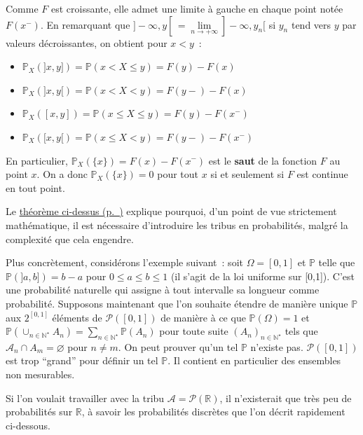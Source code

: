 \begin{remarque}\label{I-quelques-propriuxe9tuxe9s}

Comme \(F\) est croissante, elle admet une limite à gauche en chaque
point notée \(F(x^-)\). En remarquant que
\(]-\infty,y[\, = \lim\limits_{n \to +\infty}]-\infty,y_n[\) si \(y_n\)
tend vers \(y\) par valeurs décroissantes, on obtient pour \(x < y\)~:

\begin{itemize}
\tightlist
\item
  \(\mathbb{P}_X(]x,y]) = \mathbb{P}( x < X \leq y) = F(y) - F(x)\)
\item
  \(\mathbb{P}_X(]x,y[) = \mathbb{P}( x < X < y) = F(y-) - F(x)\)
\item
  \(\mathbb{P}_X([x,y]) = \mathbb{P}( x \leq X \leq y) = F(y) - F(x^-)\)
\item
  \(\mathbb{P}_X([x,y[) = \mathbb{P}( x \leq X < y) = F(y-) - F(x^-)\)
\end{itemize}

En particulier, \(\mathbb{P}_X(\{x\}) = F(x) - F(x^-)\) est le
\textbf{saut} de la fonction \(F\) au point \(x\). On a donc
\(\mathbb{P}_X(\{x\}) = 0\) pour tout \(x\) si et seulement si \(F\) est
continue en tout point.
\end{remarque}

\begin{remarque}\label{I-nuxe9cessituxe9-des-tribus}

Le \protect\hyperref[I-carac]{théorème
ci-dessus (p.~\pageref*{I-carac})} explique pourquoi, d'un point de vue
strictement mathématique, il est nécessaire d'introduire les tribus en
probabilités, malgré la complexité que cela engendre.

Plus concrètement, considérons l'exemple suivant~: soit
\(\Omega = [0,1]\) et \(\mathbb{P}\) telle que
\(\mathbb{P}(]a,b]) = b-a\) pour \(0\leq a\leq b\leq 1\) (il s'agit de
la loi uniforme sur {[}0,1{]}). C'est une probabilité naturelle qui
assigne à tout intervalle sa longueur comme probabilité. Supposons
maintenant que l'on souhaite étendre de manière unique \(\mathbb{P}\)
aux \(2^{[0,1]}\) éléments de \(\mathcal{P}([0,1])\) de manière à ce que
\(\mathbb{P}(\Omega) =1\) et
\(\mathbb{P}\left(\cup_{n\in\mathbb{N}^\star} A_n\right) = \sum_{n\in\mathbb{N}^\star} \mathbb{P}(A_n)\)
pour toute suite \((A_n)_{n\in\mathbb{N}^\star}\) tels que
\(\mathcal{A}_n\cap A_m = \varnothing\) pour \(n \neq m\). On peut
prouver qu'un tel \(\mathbb{P}\) n'existe pas. \(\mathcal{P}([0,1])\)
est trop ``grand'' pour définir un tel \(\mathbb{P}\). Il contient en
particulier des ensembles non mesurables.

Si l'on voulait travailler avec la tribu
\(\mathcal{A}= \mathcal{P}(\mathbb{R})\), il n'existerait que très peu
de probabilités sur \(\mathbb{R}\), à savoir les probabilités discrètes
que l'on décrit rapidement ci-dessous.
\end{remarque}

